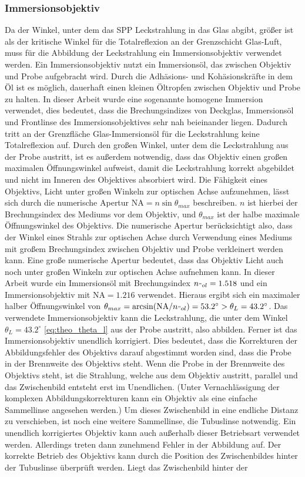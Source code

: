 \documentclass[titlepage,  ngerman]{article}
\begin{document}
	\subsubsection{Immersionsobjektiv}
	Da der Winkel, unter dem das SPP Leckstrahlung in das Glas abgibt, größer ist als der kritische Winkel für die Totalreflexion an der Grenzschicht Glas-Luft, muss für die Abbildung der Leckstrahlung ein Immersionsobjektiv verwendet werden. Ein Immersionsobjektiv nutzt ein Immersionsöl, das zwischen Objektiv und Probe aufgebracht wird. Durch die Adhäsions- und Kohäsionskräfte in dem Öl ist es möglich, dauerhaft einen kleinen Öltropfen zwischen Objektiv und Probe zu halten. In dieser Arbeit  wurde eine sogenannte homogene Immersion verwendet, dies bedeutet, dass die Brechungsindizes von Deckglas, Immersionsöl und Frontlinse des Immersionsobjektives sehr nah beieinander liegen. Dadurch tritt an der Grenzfläche Glas-Immersionsöl für die Leckstrahlung keine Totalreflexion auf. Durch den großen Winkel, unter dem die Leckstrahlung aus der Probe austritt, ist es außerdem notwendig, dass das Objektiv einen großen maximalen Öffnungswinkel aufweist, damit die Leckstrahlung korrekt abgebildet und nicht im Inneren des Objektives absorbiert wird. Die Fähigkeit eines Objektivs, Licht unter großen Winkeln zur optischen Achse aufzunehmen, lässt sich durch die numerische Apertur $\mathrm{NA} = n\sin\theta_{max}$ beschreiben. $n$ ist hierbei der Brechungsindex des Mediums vor dem Objektiv, und $\theta_{max}$ ist der halbe maximale Öffnungswinkel des Objektivs. Die numerische Apertur berücksichtigt also, dass der Winkel eines Strahls zur optischen Achse durch Verwendung eines Mediums mit großem Brechungsindex zwischen Objektiv und Probe verkleinert werden kann. Eine große numerische Apertur bedeutet, dass das Objektiv Licht auch noch unter großen Winkeln zur optischen Achse aufnehmen kann. In dieser Arbeit wurde ein Immersionsöl mit Brechungsindex $n_{"ol} = 1.518$ und ein Immersionsobjektiv mit $\mathrm{NA} = 1.216$ verwendet. Hieraus ergibt sich ein maximaler halber Öffnungswinkel von $\theta_{max} = \arcsin(\mathrm{NA} / n_{"ol}) = 53.2^\circ > \theta_L = 43.2^\circ$. Das verwendete Immersionsobjektiv kann die Leckstrahlung, die unter dem Winkel $\theta_L = 43.2^\circ$ \eqref{eq:theo_theta_l} aus der Probe austritt, also abbilden. Ferner ist das Immersionsobjektiv unendlich korrigiert. Dies bedeutet, dass die Korrekturen der Abbildungsfehler des Objektivs darauf abgestimmt worden sind, dass die Probe in der Brennweite des Objektivs steht. Wenn die Probe in der Brennweite des Objektivs steht, ist die Strahlung, welche aus dem Objektiv austritt, parallel und das Zwischenbild entsteht erst im Unendlichen. (Unter Vernachlässigung der komplexen Abbildungskorrekturen kann ein Objektiv als eine einfache Sammellinse angesehen werden.) Um dieses Zwischenbild in eine endliche Distanz zu verschieben, ist noch eine weitere Sammellinse, die Tubuslinse notwendig. Ein unendlich korrigiertes Objektiv kann auch außerhalb dieser Betriebsart verwendet werden. Allerdings treten dann zunehmend Fehler in der Abbildung auf. Der korrekte Betrieb des Objektivs kann durch die Position des Zwischenbildes hinter der Tubuslinse überprüft werden. Liegt das Zwischenbild hinter der 
\end{document}
